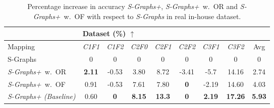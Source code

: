 \begin{table}[!htp]
\setlength{\tabcolsep}{4pt}
\caption{Percentage increase in accuracy \textit{S-Graphs+}, \mbox{\textit{S-Graphs+} w. OR} and \mbox{\textit{S-Graphs+} w. OF} with respect to \textit{S-Graphs} in real in-house dataset.}
\scriptsize
\centering
\begin{tabular}{l | c c c c c c c | c}
\toprule
& \multicolumn{3}{l}{\textbf{Dataset} (\%) $\boldsymbol{\uparrow}$} \\
\toprule
 {Mapping}  & \textit{C1F1} &  \textit{C1F2}  & \textit{C2F0} & \textit{C2F1} & \textit{C2F2} & \textit{C3F1} & \textit{C3F2} & Avg \\ 
\midrule
{S-Graphs} \cite{s_graphs} & 0 & 0 & 0 & 0 & 0  & 0 &  0 & 0 \\ 
\midrule
\mbox{\textit{S-Graphs+} w. OR}  & \textbf{2.11} & -0.53 & 3.80 & 8.72 & -3.41 & -5.7 & 14.16 &  2.74 \\ 
\mbox{\textit{S-Graphs+} w. OF} & 0.91 & -0.53 & 7.61 & 7.80 & \textbf{0} & -2.19 & 14.60 &  4.03 \\ 
\midrule
\textit{S-Graphs+ (Baseline)} & 0.60 & \textbf{0}  & \textbf{8.15} & \textbf{13.3} & \textbf{0} & \textbf{2.19} & \textbf{17.26} & \textbf{5.93}  \\ 
\bottomrule 
\end{tabular}
\label{tab:rmse_real_data_percentage_s_graphs}
\end{table}


